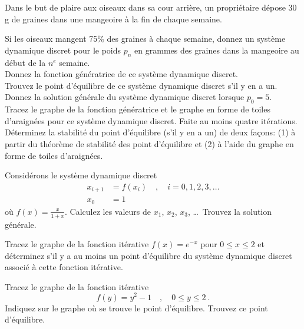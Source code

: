 \begin{question}
Dans le but de plaire aux oiseaux dans sa cour arrière, un
propriétaire dépose $30$ g de graines dans une mangeoire à la fin de
chaque semaine.

 Si les oiseaux mangent 75\% des graines à chaque semaine,
donnez un système dynamique discret pour le poids $p_n$ en grammes des
graines dans la mangeoire au début de la $n^e$ semaine.\\
 Donnez la fonction génératrice de ce système dynamique discret.\\
 Trouvez le point d'équilibre de ce système dynamique discret
s'il y en a un.\\
 Donnez la solution générale du système dynamique discret lorsque
$p_0 = 5$.\\
 Tracez le graphe de la fonction génératrice et le graphe en
forme de toiles d'araignées pour ce système dynamique discret.  Faite
au moins quatre itérations.\\
 Déterminez la stabilité du point d'équilibre (s'il y en a un) de
deux façons: (1) à partir du théorème de stabilité des point
d'équilibre et (2) à l'aide du graphe en forme de toiles d'araignées.
\label{6Q91}
\end{question}

\begin{question}[\life]
Considérons le système dynamique discret
\begin{align*}
x_{i+1} &= f(x_i) \quad , \quad i=0, 1, 2, 3, \ldots \\
x_0 &= 1
\end{align*}
où $\displaystyle f(x) = \frac{x}{1+x}$.  Calculez les valeurs de $x_1$,
$x_2$, $x_3$, \ldots \ Trouvez la solution générale.
\label{6Q92}
\end{question}

\begin{question}[\life]
Tracez le graphe de la fonction itérative $f(x) = e^{-x}$ pour
$0 \leq x \leq 2$ et déterminez s'il y a au moins un point d'équilibre
du système dynamique discret associé à cette fonction itérative.
\label{6Q93}
\end{question}

\begin{question}[\life]
Tracez le graphe de la fonction itérative
\[
f(y) = y^2 -1 \quad , \quad 0 \leq y \leq 2 \ .
\]
Indiquez sur le graphe où se trouve le point d'équilibre.  Trouvez ce
point d'équilibre.
\label{6Q94}
\end{question}

